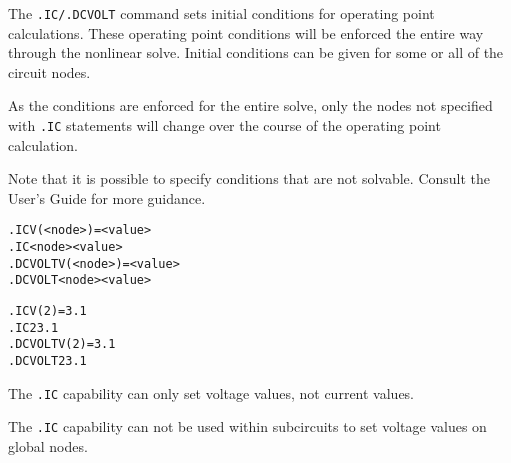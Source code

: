


\label{IC_section}

The \texttt{.IC/.DCVOLT} command sets initial conditions for operating point calculations.
These operating point conditions will be enforced the entire way through the
nonlinear solve.  Initial conditions can be given for some or all of the
circuit nodes.

As the conditions are enforced for the entire solve, only the nodes not
specified with \texttt{.IC} statements will change over the course of the
operating point calculation.

Note that it is possible to specify conditions that are not solvable.
Consult the \Xyce{} User's Guide for more guidance.

\begin{Command}
\format
\begin{alltt}
.IC V(<node>)=<value>
.IC <node> <value>
.DCVOLT V(<node>)=<value>
.DCVOLT <node> <value>
\end{alltt}

\examples
\begin{alltt}
.IC V(2)=3.1
.IC 2 3.1
.DCVOLT V(2)=3.1
.DCVOLT 2 3.1
\end{alltt}

\comments
The \texttt{.IC} capability can only set voltage values, not current values.

The \texttt{.IC} capability can not be used within subcircuits to set
voltage values on global nodes.

\end{Command}

